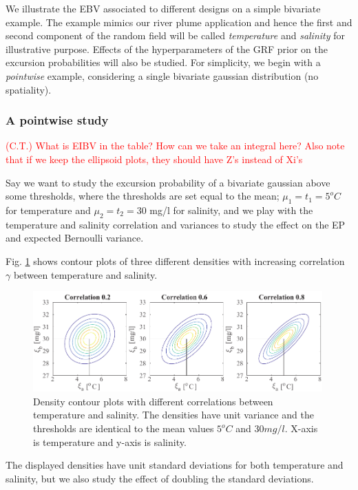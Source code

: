\documentclass[aoas]{imsart}
\begin{document}
We illustrate the EBV associated to different designs on a simple bivariate example. The example mimics our river plume application and hence the first and second component of the random field will be called \textit{temperature} and \textit{salinity} for illustrative purpose. Effects of the hyperparameters of the GRF prior on the excursion probabilities will also be studied. For simplicity, we begin with a \textit{pointwise} example, considering a single bivariate gaussian distribution (no spatiality).

\subsubsection{A pointwise study}
\textcolor{red}{(C.T.) What is EIBV in the table? How can we take an integral here? Also note that if we keep the ellipsoid plots, they should have Z's instead of Xi's}


Say we want to study the excursion probability of a bivariate gaussian above some thresholds, where the thresholds are set equal to the mean; $\mu_1=t_1=5^o C$ for temperature and  $\mu_2=t_2=30$ mg/l for salinity, and we play with the temperature and salinity correlation and variances to study the effect on the EP and expected Bernoulli variance.

Fig. \ref{illus_bivarDens} shows contour plots of three different
densities with increasing correlation $\gamma$ between temperature and
salinity. 
\begin{figure}[h!] \centering
  \includegraphics[width=0.99\textwidth]{Figures/illus_bivar.pdf}
  \caption{Density contour plots with different correlations between
    temperature and salinity. The densities have unit variance and the
    thresholds are identical to the mean values $5^o C$ and
    $30 mg/l$. X-axis is temperature and y-axis is salinity.}
\label{illus_bivarDens}
\end{figure}
The displayed densities have unit standard deviations for both
temperature and salinity, but we also study the effect of doubling the
standard deviations.
\end{document}
